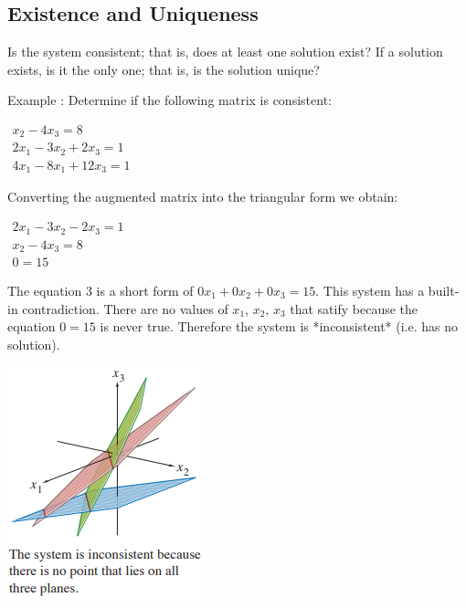 \documentclass{article}
\begin{document}
\subsection{Existence and Uniqueness}

Is the system consistent; that is, does at least one solution exist?
If a solution exists, is it the only one; that is, is the solution unique?

Example : Determine if the following matrix is consistent: 

$\begin{matrix}
x_2 - 4x_3 = 8\\
2x_1 - 3x_2 + 2x_3 = 1\\
4x_1 - 8x_1 + 12x_3 = 1
\end{matrix}$

Converting the augmented matrix into the triangular form we obtain:

$\begin{matrix}
2x_1 - 3x_2 - 2x_3 = 1\\
x_2 - 4x_3 = 8\\
0 = 15
\end{matrix}$

The equation 3 is a short form of $0x_1 + 0x_2 + 0x_3 = 15$. This system has a built-in contradiction. There are no values of $x_1$, $x_2$, $x_3$ that satify because the equation $0=15$ is never true. Therefore the system is *inconsistent* (i.e. has no solution).

\includegraphics{image3.png}
\end{document}
